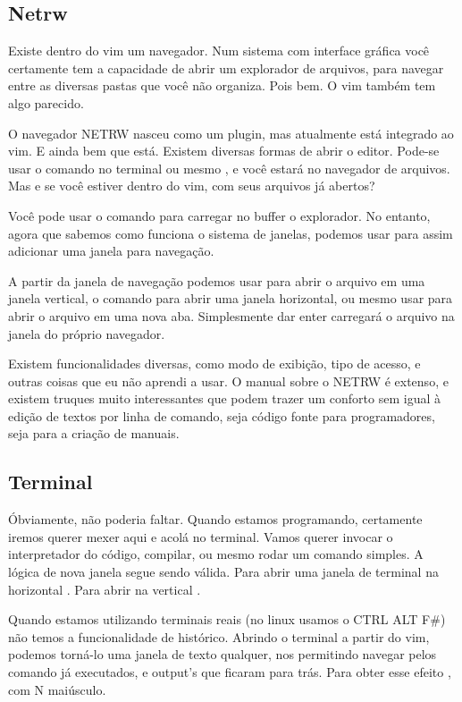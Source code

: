 \documentclass[a4paper, 12pt]{article}
\begin{document}
\subsection{Netrw}
Existe dentro do vim um navegador.
Num sistema com interface gráfica você certamente tem a capacidade de abrir um
explorador de arquivos, para navegar entre as diversas pastas que você não organiza.
Pois bem. O vim também tem algo parecido.

O navegador NETRW nasceu como um plugin, mas atualmente está integrado ao vim.
E ainda bem que está.
Existem diversas formas de abrir o editor.
Pode-se usar o comando no terminal  ou 
mesmo , e você estará no navegador de arquivos.
Mas e se você estiver dentro do vim, com seus arquivos já abertos?

Você pode usar o comando  para carregar no buffer o explorador.
No entanto, agora que sabemos como funciona o sistema de janelas, podemos usar
 para assim adicionar uma janela para navegação.

A partir da janela de navegação podemos usar  para abrir o arquivo
em uma janela vertical, o comando  para abrir uma janela horizontal,
ou mesmo usar  para abrir o arquivo em uma nova aba.
Simplesmente dar enter carregará o arquivo na janela do próprio navegador.

Existem funcionalidades diversas, como modo de exibição, tipo de acesso,
e outras coisas que eu não aprendi a usar.
O manual sobre o NETRW é extenso, e existem truques muito interessantes
que podem trazer um conforto sem igual à edição de textos por linha de comando,
seja código fonte para programadores, seja para a criação de manuais.

\subsection{Terminal}
Óbviamente, não poderia faltar.
Quando estamos programando, certamente iremos querer mexer aqui e acolá no terminal.
Vamos querer invocar o interpretador do código, compilar, ou mesmo rodar um comando simples.
A lógica de nova janela segue sendo válida.
Para abrir uma janela de terminal na horizontal .
Para abrir na vertical .

Quando estamos utilizando terminais reais (no linux usamos o CTRL ALT F\#)
não temos a funcionalidade de histórico.
Abrindo o terminal a partir do vim, podemos torná-lo uma janela de texto qualquer,
nos permitindo navegar pelos comando já executados, e output's que ficaram para trás.
Para obter esse efeito , com N maiúsculo.
\end{document}
